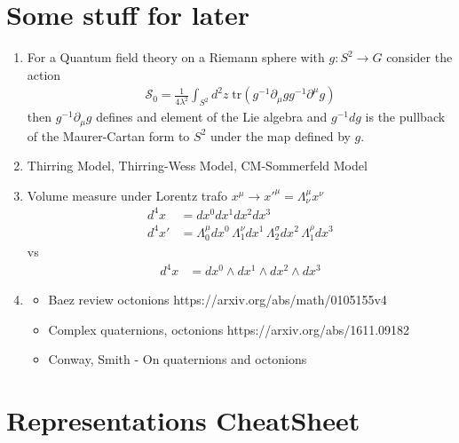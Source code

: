\documentclass[10pt,a4paper]{book}
\theoremstyle{definition}
\begin{document}
\chapter{Some stuff for later}
\begin{enumerate}
    \item For a Quantum field theory on a Riemann sphere with $g:S^2\rightarrow G$ consider the action 
    \begin{align}
        \mathcal{S}_0=\frac{1}{4\lambda^2}\int_{S^2}d^2z\;\text{tr}(g^{-1}\partial_\mu g g^{-1}\partial^\mu g)
    \end{align}
    then $g^{-1}\partial_\mu g$ defines and element of the Lie algebra and $g^{-1}dg$ is the pullback of the Maurer-Cartan form to $S^2$ under the map defined by $g$.
    \item Thirring Model, Thirring-Wess Model, CM-Sommerfeld Model
    \item Volume measure under Lorentz trafo $x^\mu\rightarrow x'^\mu=\Lambda^\mu_\nu x^\nu$
    \begin{align}
        d^4x
        &=dx^0dx^1dx^2dx^3\\
        d^4x'&=\Lambda^\mu_0dx^0\,\Lambda^\nu_1dx^1\,\Lambda^\sigma_2dx^2\,\Lambda^\rho_1dx^3
    \end{align}
    vs
    \begin{align}
        d^4x
        &=dx^0\wedge dx^1\wedge dx^2\wedge dx^3
    \end{align}
    \item 
    \begin{itemize}
        \item Baez review octonions {\sc https://arxiv.org/abs/math/0105155v4}
        \item Complex quaternions, octonions {\sc https://arxiv.org/abs/1611.09182}
        \item Conway, Smith - On quaternions and octonions
    \end{itemize}
\end{enumerate}


\newpage
\chapter{Representations CheatSheet}
\end{document}
